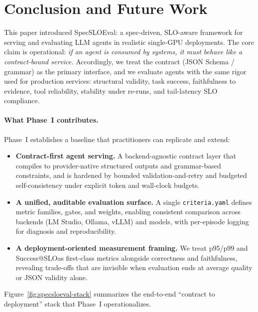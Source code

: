 \documentclass[11pt]{article}
\newcommand{\slo}{\ensuremath{\mathrm{SLO}}}
\begin{document}
\section{Conclusion and Future Work}
\label{sec:conclusion}

This paper introduced SpecSLOEval: a spec-driven, SLO-aware framework for serving and evaluating LLM agents in realistic single-GPU deployments.
The core claim is operational:
\emph{if an agent is consumed by systems, it must behave like a contract-bound service.}
Accordingly, we treat the contract (JSON Schema / grammar) as the primary interface, and we evaluate agents with the same rigor used for production services: structural validity, task success, faithfulness to evidence, tool reliability, stability under re-runs, and tail-latency SLO compliance.

\paragraph{What Phase~I contributes.}
Phase~I establishes a baseline that practitioners can replicate and extend:

\begin{itemize}[leftmargin=12pt]
    \item \textbf{Contract-first agent serving.}
    A backend-agnostic contract layer that compiles to provider-native structured outputs and grammar-based constraints, and is hardened by bounded validation-and-retry and budgeted self-consistency under explicit token and wall-clock budgets.

    \item \textbf{A unified, auditable evaluation surface.}
    A single \texttt{criteria.yaml} defines metric families, gates, and weights, enabling consistent comparison across backends (LM Studio, Ollama, vLLM) and models, with per-episode logging for diagnosis and reproducibility.

    \item \textbf{A deployment-oriented measurement framing.}
    We treat p95/p99 and Success@\slo as first-class metrics alongside correctness and faithfulness, revealing trade-offs that are invisible when evaluation ends at average quality or JSON validity alone.
\end{itemize}

Figure~\ref{fig:specsloeval-stack} summarizes the end-to-end ``contract to deployment'' stack that Phase~I operationalizes.
\end{document}
